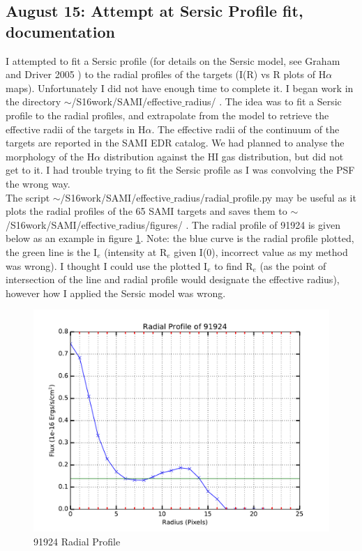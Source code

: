 \documentclass[10pt,letterpaper]{article}
\begin{document}
\subsection{August 15: Attempt at Sersic Profile fit, documentation}
I attempted to fit a Sersic profile (for details on the Sersic model, see Graham and Driver 2005 \cite{sersic}) to the radial profiles of the targets (I(R) vs R plots of H$\alpha$ maps). Unfortunately I did not have enough time to complete it. I began work in the directory $\sim$/S16work/SAMI/effective$\_$radius/ . The idea was to fit a Sersic profile to the radial profiles, and extrapolate from the model to retrieve the effective radii of the targets in H$\alpha$. The effective radii of the continuum of the targets are reported in the SAMI EDR catalog. We had planned to analyse the morphology of the H$\alpha$ distribution against the HI gas distribution, but did not get to it. I had trouble trying to fit the Sersic profile as I was convolving the PSF the wrong way.\\

The script $\sim$/S16work/SAMI/effective$\_$radius/radial$\_$profile.py may be useful as it plots the radial profiles of the 65 SAMI targets and saves them to $\sim$/S16work/SAMI/effective$\_$radius/figures/ . The radial profile of 91924 is given below as an example in figure \ref{fig: 91924 Radial profile}. Note: the blue curve is the radial profile plotted, the green line is the I$_e$ (intensity at R$_e$ given I(0), incorrect value as my method was wrong). I thought I could use the plotted I$_e$ to find R$_e$ (as the point of intersection of the line and radial profile would designate the effective radius), however how I applied the Sersic model was wrong.\\

\begin{figure}[h!]
\center
\caption{91924 Radial Profile}\label{fig: 91924 Radial profile}
\includegraphics[scale=0.4]{figures/91924_radial_profile.pdf}
\end{figure}
\end{document}
